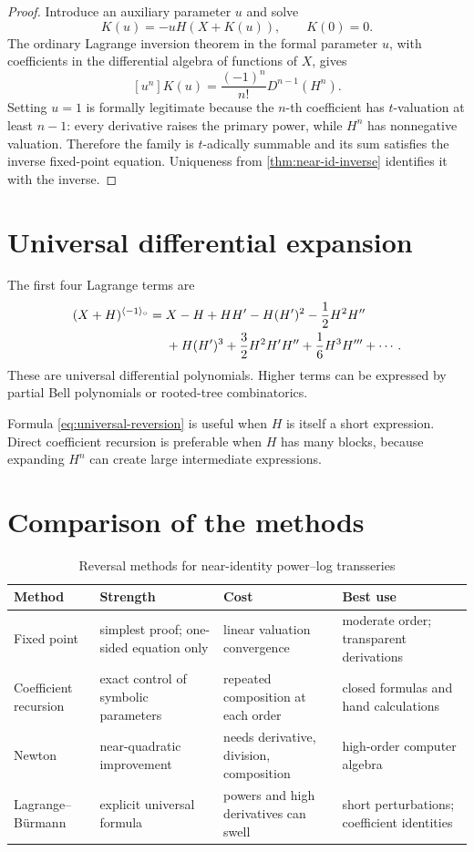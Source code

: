 \documentclass[11pt,openany]{book}
\theoremstyle{definition}
\theoremstyle{plain}
\theoremstyle{remark}
\newcommand{\invcomp}{^{\langle -1\rangle_{\circ}}}
\begin{document}
\begin{proof}
Introduce an auxiliary parameter \(u\) and solve
\[
 K(u)=-uH(X+K(u)),\qquad K(0)=0.
\]
The ordinary Lagrange inversion theorem in the formal parameter \(u\), with coefficients in the differential algebra of functions of \(X\), gives
\[
 [u^n]K(u)=\frac{(-1)^n}{n!}D^{n-1}(H^n).
\]
Setting \(u=1\) is formally legitimate because the \(n\)-th coefficient has \(t\)-valuation at least \(n-1\): every derivative raises the primary power, while \(H^n\) has nonnegative valuation. Therefore the family is \(t\)-adically summable and its sum satisfies the inverse fixed-point equation. Uniqueness from \cref{thm:near-id-inverse} identifies it with the inverse.
\end{proof}

\section{Universal differential expansion}
The first four Lagrange terms are
\begin{align}
 (X+H)\invcomp={}&X-H+HH'
 -H(H')^2-\frac12H^2H''\notag\\
 &+H(H')^3+\frac32H^2H'H''+\frac16H^3H'''
 +\cdots.
\label{eq:universal-reversion}
\end{align}
These are universal differential polynomials. Higher terms can be expressed by partial Bell polynomials or rooted-tree combinatorics.

Formula \cref{eq:universal-reversion} is useful when \(H\) is itself a short expression. Direct coefficient recursion is preferable when \(H\) has many blocks, because expanding \(H^n\) can create large intermediate expressions.

\section{Comparison of the methods}
\begin{table}[htbp]
\centering
\caption{Reversal methods for near-identity power--log transseries}\label{tab:reversal-methods}
\small
\begin{tabularx}{\textwidth}{@{}p{}XXX@{}}
\toprule
Method & Strength & Cost & Best use\\
\midrule
Fixed point & simplest proof; one-sided equation only & linear valuation convergence & moderate order; transparent derivations\\
Coefficient recursion & exact control of symbolic parameters & repeated composition at each order & closed formulas and hand calculations\\
Newton & near-quadratic improvement & needs derivative, division, composition & high-order computer algebra\\
Lagrange--B\"urmann & explicit universal formula & powers and high derivatives can swell & short perturbations; coefficient identities\\
\bottomrule
\end{tabularx}
\end{table}
\end{document}
